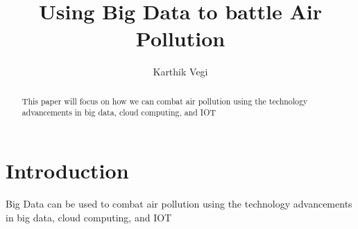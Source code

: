 \documentclass[sigconf]{acmart}
\begin{document}
\title{Using Big Data to battle Air Pollution}

\author{Karthik Vegi}

\renewcommand{\shortauthors}{K. Vegi}


\begin{abstract}
This paper will focus on how we can combat air pollution using the technology advancements in big data, cloud computing, and IOT
\end{abstract}

\maketitle

\section{Introduction}

Big Data can be used to combat air pollution using the technology advancements in big data, cloud computing, and IOT
\end{document}
